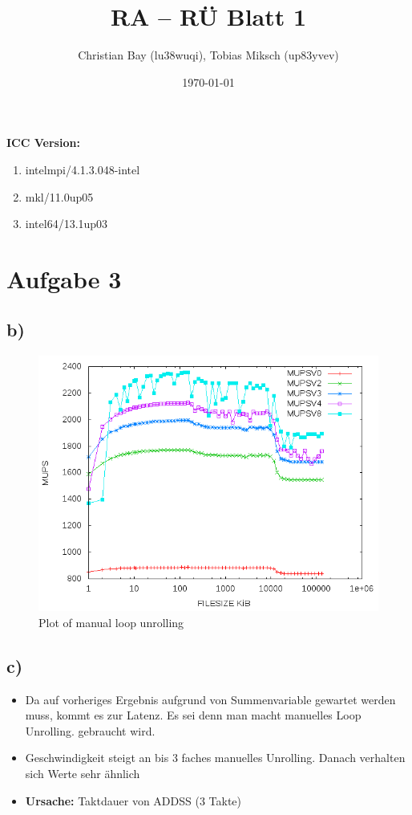 \documentclass{article}
\title{RA -- R\"U Blatt 1}
\author{Christian Bay (lu38wuqi), Tobias Miksch (up83yvev)}
\date{\today}
\begin{document}
\maketitle

\textbf{ICC Version:}
\begin{enumerate}
	\item intelmpi/4.1.3.048-intel
	\item mkl/11.0up05
	\item intel64/13.1up03
\end{enumerate}

\vspace*{6pt}

\section*{Aufgabe 3}
\subsection*{b)}

\begin{center}
	\begin{figure}[h]
	\includegraphics[scale=0.6]{pics/a3b.png}
	\caption{Plot of manual loop unrolling}
	\end{figure}
\end{center}

\subsection*{c)}
\begin{itemize}
	\item Da auf vorheriges Ergebnis aufgrund von Summenvariable gewartet werden muss,
		kommt es zur Latenz. Es sei denn man macht manuelles Loop Unrolling.
		gebraucht wird.
	\item Geschwindigkeit steigt an bis 3 faches manuelles Unrolling.
		Danach verhalten sich Werte sehr ähnlich
	\item \textbf{Ursache:} Taktdauer von ADDSS (3 Takte)
\end{itemize}
\end{document}

